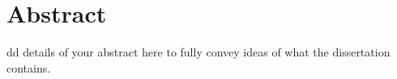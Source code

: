 \chapter*{Abstract}
\begin{SingleSpace}
dd details of your abstract here to fully convey ideas of what the dissertation contains. 
\lipsum[1-2]
\end{SingleSpace}
\clearpage